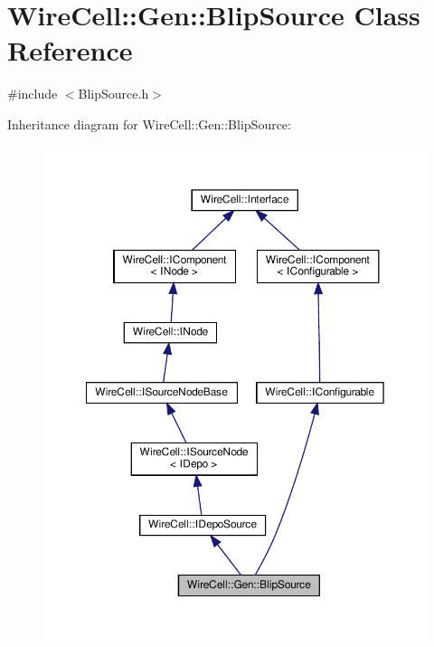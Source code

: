 \hypertarget{class_wire_cell_1_1_gen_1_1_blip_source}{}\section{Wire\+Cell\+:\+:Gen\+:\+:Blip\+Source Class Reference}
\label{class_wire_cell_1_1_gen_1_1_blip_source}


{\ttfamily \#include $<$Blip\+Source.\+h$>$}



Inheritance diagram for Wire\+Cell\+:\+:Gen\+:\+:Blip\+Source\+:
\nopagebreak
\begin{figure}[H]
\begin{center}
\leavevmode
\includegraphics[width=350pt]{class_wire_cell_1_1_gen_1_1_blip_source__inherit__graph}
\end{center}
\end{figure}


